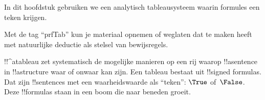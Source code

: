 \documentclass[openany]{memoir}
\begin{document}
\begingroup
\def\olfilename{OLP-0098}
\def\olfilepath{content/first-order-logic/tableaux/}
\hypertarget{unit-OLP-0098}{}



      {}
      {}

\begin{editorial}
In dit hoofdstuk gebruiken we een analytisch tableausysteem waarin
formules een teken krijgen.
  
Met de tag ``prfTab'' kun je materiaal opnemen of weglaten dat te
maken heeft met natuurlijke deductie als stelsel van bewijsregels.
\end{editorial}












\endgroup

\begingroup
\def\olfilename{OLP-0099}
\def\olfilepath{content/first-order-logic/tableaux/}
\hypertarget{unit-OLP-0099}{}



      {}
      {}


!!^a{tableau} zet systematisch de mogelijke manieren op een rij
waarop !!a{sentence} in !!a{structure} waar of onwaar kan zijn. Een
tableau bestaat uit !!{signed formula}s. Dat zijn !!{sentence}s met
een waarheidswaarde als ``teken'': $\True$ of~$\False$. Deze
!!{formula}s staan in een boom die naar beneden groeit.
\end{document}
